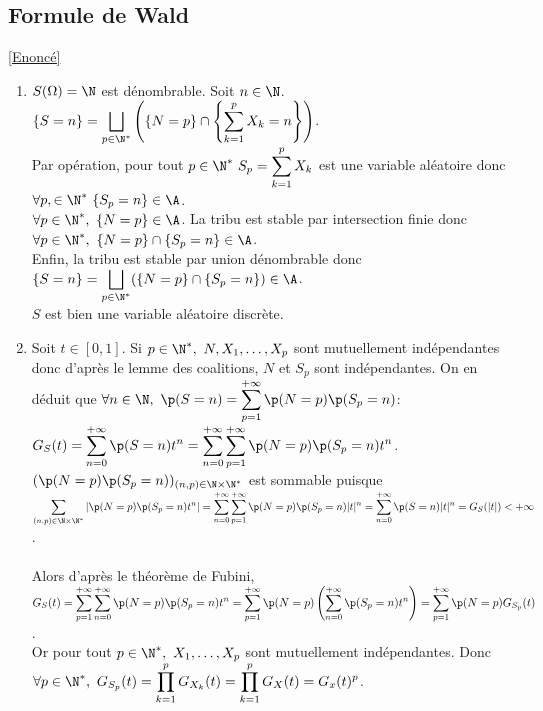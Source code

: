 \documentclass[8pt]{book}
\begin{document}
	\subsection{Formule de Wald }
	\label{Formule de Wald corrigé}
	\textcolor{blue}{\hyperref[Formule de Wald]{[Enoncé]}}\\
	\begin{enumerate}
		\item $S(\Omega)=\N$ est dénombrable. Soit $n\in \N$.\\
		$\{S=n\}=\displaystyle\bigsqcup\limits_{p\in \N^*}\left(\{N=p\}\cap\left\{\sum\limits_{k=1}^pX_k=n\right\}\right)$.\\
		Par opération, pour tout $p\in \N^*\ S_p=\displaystyle\sum\limits_{k=1}^pX_k$ est une variable aléatoire donc $\forall p,\in \N^*\ \{S_p=n\}\in \A$.\\
		$\forall p\in \N^*,\ \{N=p\}\in \A$. La tribu est stable par intersection finie donc $\forall p\in \N^*,\ \{N=p\}\cap\{S_p=n\}\in \A$.\\
		Enfin, la tribu est stable par union dénombrable donc $\{S=n\}=\displaystyle\bigsqcup\limits_{p\in \N^*}(\{N=p\}\cap\{S_p=n\})\in \A$.\\
		$S$ est bien une variable aléatoire discrète.
		\item Soit $t\in [0,1]$. Si $p\in \N^*,\ N,X_1,\dots,X_p$ sont mutuellement indépendantes donc d'après le lemme des coalitions, $N$ et $S_p$ sont indépendantes. On en déduit que $\forall n\in \N,\ \p(S=n)=\displaystyle\sum\limits_{p=1}^{+\infty}\p(N=p)\p(S_p=n)$:\\
		$G_S(t)=\displaystyle\sum\limits_{n=0}^{+\infty}\p(S=n)t^n=\sum\limits_{n=0}^{+\infty}\sum\limits_{p=1}^{+\infty}\p(N=p)\p(S_p=n)t^n$.\\
		$(\p(N=p)\p(S_p=n))_{(n,p)\in \N\times \N^*}$ est sommable puisque\\
		$\displaystyle\sum\limits_{(n,p)\in \N\times \N^*}|\p(N=p)\p(S_p=n)t^n|=\sum\limits_{n=0}^{+\infty}\sum\limits_{p=1}^{+\infty}\p(N=p)\p(S_p=n)|t|^n=\sum\limits_{n=0}^{+\infty}\p(S=n)|t|^n=G_S(|t|)<+\infty$.\\\\
		Alors d'après le théorème de Fubini,\\
		$G_S(t)=\displaystyle\sum\limits_{p=1}^{+\infty}\sum\limits_{n=0}^{+\infty}\p(N=p)\p(S_p=n)t^n=\sum\limits_{p=1}^{+\infty}\p(N=p)\left(\sum\limits_{n=0}^{+\infty}\p(S_p=n)t^n\right)=\sum\limits_{p=1}^{+\infty}\p(N=p)G_{S_p}(t)$.\\
		Or pour tout $p\in \N^*,\ X_1,\dots,X_p$ sont mutuellement indépendantes. Donc $\forall p\in \N^*,\ G_{S_p}(t)=\displaystyle\prod\limits_{k=1}^pG_{X_k}(t)=\prod\limits_{k=1}^pG_X(t)=G_x(t)^p$.\\

\end{enumerate}
\end{document}
